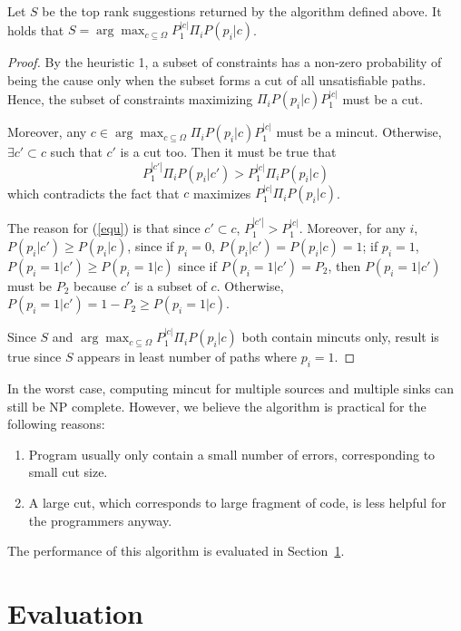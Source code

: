 \begin{Theorem}
Let $S$ be the top rank suggestions returned by the algorithm defined above.
It holds that $S = \arg\max_{c\subseteq \Omega}P_1^{|c|} \Pi_i P(p_i|c)$.  
\end{Theorem}

\begin{proof}
By the heuristic 1, a subset of constraints has a non-zero probability of being
the cause only when the subset forms a cut of all unsatisfiable paths. Hence,
the subset of constraints maximizing $\Pi_i P(p_i|c) P_1^{|c|}$ must be a cut.

Moreover, any $c\in \arg\max_{c\subseteq \Omega}\Pi_i P(p_i|c) P_1^{|c|}$ must
be a mincut. Otherwise, $\exists c'\subset c$ such that $c'$ is a cut too. Then
it must be true that 
\begin{equation}
\label{equ}
P_1^{|c'|} \Pi_i P(p_i|c') > P_1^{|c|} \Pi_i P(p_i|c)
\end{equation}
which contradicts the fact that $c$ maximizes $P_1^{|c|} \Pi_i P(p_i|c)$.

The reason for (\ref{equ}) is that since $c'\subset c$, $P_1^{|c'|}>
P_1^{|c|}$. Moreover, for any $i$,  $P(p_i|c') \geq P(p_i|c)$, since if
$p_i=0$, $P(p_i|c')=P(p_i|c)=1$; if $p_i=1$, $P(p_i=1|c')\geq P(p_i=1|c)$ since
if $P(p_i=1|c')=P_2$, then $P(p_i=1|c')$ must be $P_2$ because $c'$ is a subset
of $c$.  Otherwise, $P(p_i=1|c')=1-P_2\geq P(p_i=1|c)$.

Since $S$ and $\arg\max_{c\subseteq \Omega}P_1^{|c|} \Pi_i P(p_i|c)$ both
contain mincuts only, result is true since $S$ appears in least number of paths
where $p_i=1$.
\end{proof}

In the worst case, computing mincut for multiple sources and multiple sinks can
still be NP complete. However, we believe the algorithm is practical for the
following reasons:
\begin{enumerate}
\item Program usually only contain a small number of errors, corresponding to
small cut size.

\item A large cut, which corresponds to large fragment of code, is less helpful
for the programmers anyway.
\end{enumerate}

The performance of this algorithm is evaluated in Section~\ref{sec:evaluation}.

\section{Evaluation}
\label{sec:evaluation}

